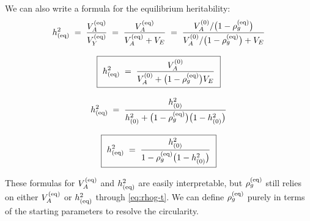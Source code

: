 \documentclass[12pt]{article}
\begin{document}
We can also write a formula for the equilibrium heritability:
\begin{equation}\label{eq:hsq-eq}
\begin{gathered}
    h^2_{(\mathrm{eq})} \;=\; \frac{V_A^{(\mathrm{eq})}}{V_Y^{(\mathrm{eq})}} \;=\; \frac{V_A^{(\mathrm{eq})}}{V_A^{(\mathrm{eq})} + V_E}
    \;=\; \frac{V_A^{(0)}/\big(1-\rho_g^{(\mathrm{eq})}\big)}{V_A^{(0)}/\big(1-\rho_g^{(\mathrm{eq})}\big) + V_E} \\[8pt]
    \boxed{\ h^2_{(\mathrm{eq})} \;=\; \frac{V_A^{(0)}}{V_A^{(0)} + \big(1-\rho_g^{(\mathrm{eq})}\big)V_E}\ } \\[8pt]
    h^2_{(\mathrm{eq})} \;=\; \frac{h^2_{(0)}}{h^2_{(0)} + \big(1-\rho_g^{(\mathrm{eq})}\big)\big(1-h^2_{(0)}\big)} \\[8pt]
    \boxed{\ h^2_{(\mathrm{eq})} \;=\; \frac{h^2_{(0)}}{1 - \rho_g^{(\mathrm{eq})}\big(1-h^2_{(0)}\big)}\ }
\end{gathered}
\end{equation}

These formulas for $V_A^{(\mathrm{eq})}$ and $h^2_{(\mathrm{eq})}$ are easily interpretable, but $\rho_g^{(\mathrm{eq})}$ still relies on either $V_A^{(\mathrm{eq})}$ or $h^2_{(\mathrm{eq})}$ through \eqref{eq:rhog-t}.
We can define $\rho_g^{(\mathrm{eq})}$ purely in terms of the starting parameters to resolve the circularity.
\end{document}
